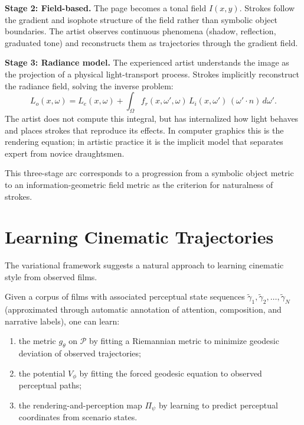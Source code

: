 \documentclass[12pt,a4paper]{article}
\theoremstyle{plain}
\theoremstyle{definition}
\begin{document}
\textbf{Stage 2: Field-based.} The page becomes a tonal field $I(x,y)$. Strokes
follow the gradient and isophote structure of the field rather than symbolic
object boundaries. The artist observes continuous phenomena (shadow, reflection,
graduated tone) and reconstructs them as trajectories through the gradient field.

\textbf{Stage 3: Radiance model.} The experienced artist understands the image
as the projection of a physical light-transport process. Strokes implicitly
reconstruct the radiance field, solving the inverse problem:
\[
L_o(x,\omega) = L_e(x,\omega)
+ \int_\Omega f_r(x,\omega',\omega)\,L_i(x,\omega')\,(\omega'\cdot n)\,d\omega'.
\]
The artist does not compute this integral, but has internalized how light behaves
and places strokes that reproduce its effects. In computer graphics this is the
rendering equation; in artistic practice it is the implicit model that separates
expert from novice draughtsmen.

This three-stage arc corresponds to a progression from a symbolic object metric
to an information-geometric field metric as the criterion for naturalness of
strokes.

\section{Learning Cinematic Trajectories}
\label{sec:learning}

The variational framework suggests a natural approach to learning cinematic
style from observed films.

Given a corpus of films with associated perceptual state sequences
$\tilde\gamma_1, \tilde\gamma_2, \dots, \tilde\gamma_N$ (approximated through
automatic annotation of attention, composition, and narrative labels), one can
learn:
\begin{enumerate}[label=(\alph*)]
\item the metric $g_\theta$ on $\mathcal{P}$ by fitting a Riemannian metric
to minimize geodesic deviation of observed trajectories;
\item the potential $V_\phi$ by fitting the forced geodesic equation to
observed perceptual paths;
\item the rendering-and-perception map $\Pi_\psi$ by learning to predict
perceptual coordinates from scenario states.
\end{enumerate}
\end{document}
